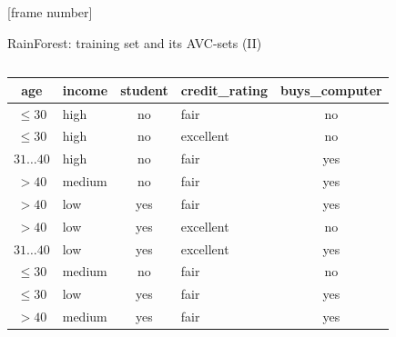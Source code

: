 \documentclass[aspectratio=169,t,table]{beamer}
\begin{document}
  {
    [frame number]
    \begin{frame}{RainForest: training set and its AVC-sets (II)}
      \begin{columns}
        \begin{column}{0.6\textwidth}
          \begin{tabular}{|c|l|c|l|c|}
            \hline
            \cellcolor{blue!20}age & \cellcolor{blue!20}income & \cellcolor{blue!20}student & \cellcolor{blue!20}credit\_rating & \cellcolor{brown!20}buys\_computer \\\hline
            \cellcolor{yellow!20}$\leq30$ & \cellcolor{yellow!20}high & \cellcolor{yellow!20}no & \cellcolor{yellow!20}fair & \cellcolor{red!20}no \\\hline
            \cellcolor{yellow!20}$\leq30$ & \cellcolor{yellow!20}high & \cellcolor{yellow!20}no & \cellcolor{yellow!20}excellent & \cellcolor{red!20}no \\\hline
            \cellcolor{yellow!20}$31\ldots40$ & \cellcolor{yellow!20}high & \cellcolor{yellow!20}no & \cellcolor{yellow!20}fair & \cellcolor{green!20}yes \\\hline
            \cellcolor{yellow!20}$>40$ & \cellcolor{yellow!20}medium & \cellcolor{yellow!20}no & \cellcolor{yellow!20}fair & \cellcolor{green!20}yes \\\hline
            \cellcolor{yellow!20}$>40$ & \cellcolor{yellow!20}low & \cellcolor{yellow!20}yes & \cellcolor{yellow!20}fair & \cellcolor{green!20}yes \\\hline
            \cellcolor{yellow!20}$>40$ & \cellcolor{yellow!20}low & \cellcolor{yellow!20}yes & \cellcolor{yellow!20}excellent & \cellcolor{red!20}no \\\hline
            \cellcolor{yellow!20}$31\ldots40$ & \cellcolor{yellow!20}low & \cellcolor{yellow!20}yes & \cellcolor{yellow!20}excellent & \cellcolor{green!20}yes \\\hline
            \cellcolor{yellow!20}$\leq30$ & \cellcolor{yellow!20}medium & \cellcolor{yellow!20}no & \cellcolor{yellow!20}fair & \cellcolor{red!20}no \\\hline
            \cellcolor{yellow!20}$\leq30$ & \cellcolor{yellow!20}low & \cellcolor{yellow!20}yes & \cellcolor{yellow!20}fair & \cellcolor{green!20}yes \\\hline
            \cellcolor{yellow!20}$>40$ & \cellcolor{yellow!20}medium & \cellcolor{yellow!20}yes & \cellcolor{yellow!20}fair & \cellcolor{green!20}yes \\\hline

\end{tabular}
\end{column}
\end{columns}
\end{frame}}
\end{document}
